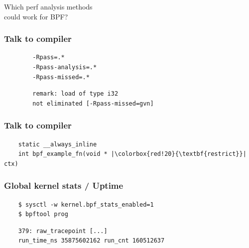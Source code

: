 \documentclass[usenames,dvipsnames, 18pt, compress, aspectratio=169]{beamer}
\begin{document}
\fontsize{26pt}{26}\selectfont
\begin{frame}[fragile]{}
    \frametitle{}

    \begin{center}
        Which perf analysis methods\\
        could work for BPF?
    \end{center}
\end{frame}

\fontsize{17pt}{18}\selectfont

\begin{frame}[fragile]{}
    \frametitle{Talk to compiler}

    \begin{center}
        \begin{verbatim}
        -Rpass=.*
        -Rpass-analysis=.*
        -Rpass-missed=.*
        \end{verbatim}
        \vspace{0.5cm}
        \begin{verbatim}
        remark: load of type i32
        not eliminated [-Rpass-missed=gvn]
        \end{verbatim}
    \end{center}
\end{frame}

\begin{frame}[fragile]{}
    \frametitle{Talk to compiler}

    \begin{center}
        \begin{verbatim}
    static __always_inline
    int bpf_example_fn(void * |\colorbox{red!20}{\textbf{restrict}}| ctx)
        \end{verbatim}
    \end{center}
\end{frame}

\begin{frame}[fragile]{}
    \frametitle{Global kernel stats / Uptime}

    \begin{center}
        \begin{verbatim}
    $ sysctl -w kernel.bpf_stats_enabled=1
    $ bpftool prog
        \end{verbatim}
        \vspace{0.5cm}
        \begin{verbatim}
    379: raw_tracepoint [...]
    run_time_ns 35875602162 run_cnt 160512637
        \end{verbatim}
    \end{center}
\end{frame}
\end{document}

